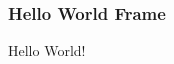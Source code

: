 \documentclass{beamer}[12pt]
\begin{document}
	\begin{frame}
		\frametitle{Hello World Frame}
		Hello World!
	\end{frame}
\end{document}
